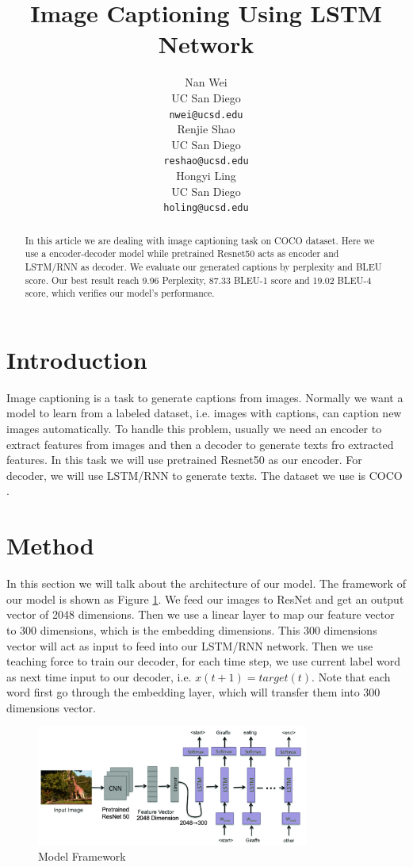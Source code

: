 \documentclass{article} %
\title{Image Captioning Using LSTM Network}
\author{
Nan Wei \\
UC San Diego\\
\texttt{nwei@ucsd.edu} \\
\And
Renjie Shao \\
UC San Diego \\
\texttt{reshao@ucsd.edu} \\
\And
Hongyi Ling \\
UC San Diego \\
\texttt{holing@ucsd.edu} \\
}
\begin{document}
\maketitle

\begin{abstract}
    In this article we are dealing with image captioning task on COCO dataset. Here we use a encoder-decoder model while pretrained Resnet50 acts as encoder and LSTM/RNN as decoder. We evaluate our generated captions by perplexity and BLEU score. Our best result reach 9.96 Perplexity, 87.33 BLEU-1 score and 19.02 BLEU-4 score, which verifies our model's performance.

\end{abstract}

\section{Introduction}

    Image captioning is a task to generate captions from images. Normally we want a model to learn from a labeled dataset, i.e. images with captions, can caption new images automatically. To handle this problem, usually we need an encoder to extract features from images and then a decoder to generate texts fro extracted features. In this task we will use pretrained Resnet50 \cite{he2016deep} as our encoder. For decoder, we will use LSTM/RNN to generate texts. The dataset we use is COCO \cite{lin2014microsoft}.


\section{Method}
In this section we will talk about the architecture of our model. The framework of our model is shown as Figure \ref{frame}. We feed our images to ResNet and get an output vector of 2048 dimensions. Then we use a linear layer to map our feature vector to 300 dimensions, which is the embedding dimensions. This 300 dimensions vector will act as input to feed into our LSTM/RNN network. Then we use teaching force to train our decoder, for each time step, we use current label word as next time input to our decoder, i.e. $x(t+1)=target(t)$. Note that each word first go through the embedding layer, which will transfer them into 300 dimensions vector.

\begin{figure}[htb!]
    \centering
     \includegraphics[width=0.8\textwidth]{frame}
    \caption{Model Framework \cite{10.1007/978-3-030-04780-1_23}}
    \label{frame}
\end{figure}
\end{document}
